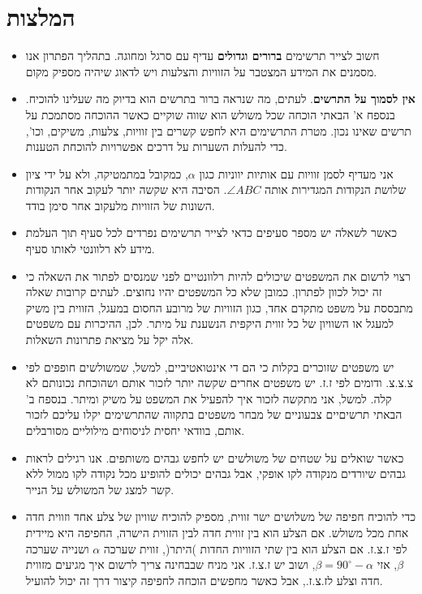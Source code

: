 

\np

\section{המלצות}

\begin{itemize}
\item
חשוב לצייר תרשימים 
\textbf{ברורים וגדולים}
עדיף עם סרגל ומחוגה. בתהליך הפתרון אנו מסמנים את המידע המצטבר על הזוויות והצלעות ויש לדאוג שיהיה מספיק מקום.

\item
\textbf{אין לסמוך על התרשים}.
לעתים, מה שנראה ברור בתרשים הוא בדיוק מה שעלינו להוכיח. בנספח א' הבאתי הוכחה שכל משולש הוא שווה שוקיים כאשר ההוכחה מסתמכת על תרשים שאינו נכון. מטרת התרשימים היא לחפש קשרים בין זוויות, צלעות, משיקים, וכו', כדי להעלות השערות על דרכים אפשרויות להוכחת הטענות.

\item
אני מעדיף לסמן זוויות עם אותיות יווניות כגון
$\alpha$,
כמקובל במתמטיקה, ולא על ידי ציון שלושת הנקודות המגדירות אותה
$\angle ABC$.
הסיבה היא שקשה יותר לעקוב אחר הנקודות השונות של הזוויות מלעקוב אחר סימן בודד.

\item
כאשר לשאלה יש מספר סעיפים כדאי לצייר תרשימים נפרדים לכל סעיף תוך העלמת מידע לא רלוונטי לאותו סעיף.

\item
רצוי לרשום את המשפטים שיכולים להיות רלוונטיים לפני שמנסים לפתור את השאלה כי זה יכול לכוון לפתרון. כמובן שלא כל המשפטים יהיו נחוצים. לעתים קרובות שאלה מתבססת על משפט מתקדם אחד, כגון הזוויות של מרובע החסום במעגל, הזווית בין משיק למעגל או השוויון של כל זווית היקפית הנשענת על מיתר. לכן, ההיכרות עם משפטים אלה יקל על מציאת פתרונות השאלות.

\item
יש משפטים שזוכרים בקלות כי הם די אינטואטיביים, למשל, שמשולשים חופפים לפי צ.צ.צ. ודומים לפי ז.ז. יש משפטים אחרים שקשה יותר לזכור אותם ושהוכחת נכונותם לא קלה. למשל, אני מתקשה לזכור איך להפעיל את המשפט על משיק ומיתר. בנספח ב' הבאתי תרשיםיים צבעוניים של מבחר משפטים בתקווה שהתרשימים יקלו עליכם לזכור אותם, בוודאי יחסית לניסוחים מילוליים מסורבלים.

\item
כאשר שואלים על שטחים של משולשים יש לחפש גבהים משותפים. אנו רגילים לראות גבהים שיורדים מנקודה לקו אופקי, אבל גבהים יכולים להופיע מכל נקודה לקו ממול ללא קשר למצג של המשולש על הנייר.

\item
כדי להוכיח חפיפה של משלושים ישר זווית, מספיק להוכיח שוויון של צלע אחד וזווית חדה אחת מכל משולש. אם הצלע הוא בין זווית חדה לבין הזווית הישרה, החפיפה היא מיידית לפי ז.צ.ז. אם הצלע הוא בין שתי הזוויות החדות )היתר(, זווית שערכה 
$\alpha$
ושנייה שערכה
$\beta$,
אזי
$\beta=90^\circ-\alpha$,
ושוב יש ז.צ.ז. אני מניח שבבחינה צריך לרשום איך מגיעים מזווית חדה וצלע לז.צ.ז., אבל כאשר מחפשים הוכחה לחפיפה קיצור דרך זה יכול להועיל.

\end{itemize}

